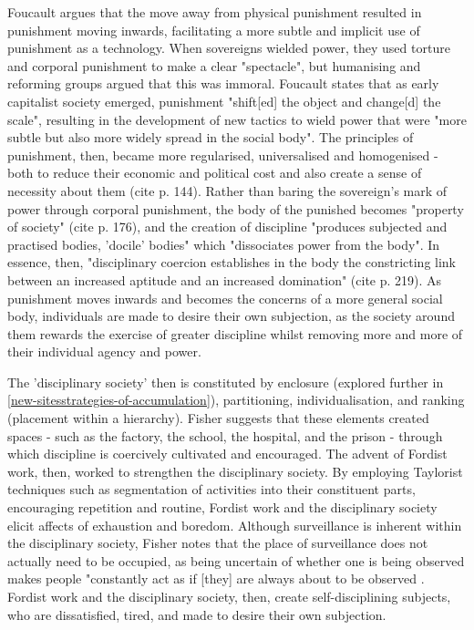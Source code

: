 Foucault argues that the move away from physical punishment resulted in punishment moving inwards, facilitating a more subtle and implicit use of punishment as a technology. When sovereigns wielded power, they used torture and corporal punishment to make a clear "spectacle", but humanising and reforming groups argued that this was immoral. Foucault states that as early capitalist society emerged, punishment "shift[ed] the object and change[d] the scale", resulting in the development of new tactics to wield power that were "more subtle but also more widely spread in the social body". The principles of punishment, then, became more regularised, universalised and homogenised - both to reduce their economic and political cost and also create a sense of necessity about them (cite p. 144). Rather than baring the
sovereign's mark of power through corporal punishment, the body of the punished becomes "property of society" (cite p. 176), and the creation of discipline "produces subjected and practised bodies, 'docile' bodies" which "dissociates power from the body". In essence, then, "disciplinary coercion establishes in the body the constricting link between an increased aptitude and an increased domination" (cite p. 219). As punishment moves inwards and becomes the concerns of a more general social body, individuals are made to desire their own subjection, as the society around them rewards the exercise of greater discipline whilst removing more and more of their individual agency and power.

The 'disciplinary society' then is constituted by enclosure (explored further in \ref{new-sitesstrategies-of-accumulation}), partitioning, individualisation, and ranking (placement within a hierarchy). Fisher suggests that these elements created spaces - such as the factory, the school, the hospital, and the prison - through which discipline is coercively cultivated and encouraged. The advent of Fordist work, then, worked to strengthen the disciplinary society. By employing Taylorist techniques such as segmentation of activities into their constituent parts, encouraging repetition and routine, Fordist work and the disciplinary society elicit affects of exhaustion and boredom. Although surveillance is inherent within the disciplinary society, Fisher notes that the place of surveillance does not actually need to be occupied, as being uncertain of whether one is being observed makes people "constantly act as if [they] are always about to be observed \citep[56]{fisher_capitalist_2009}. Fordist work and the disciplinary society, then, create self-disciplining subjects, who are dissatisfied, tired, and made to desire their own subjection.

